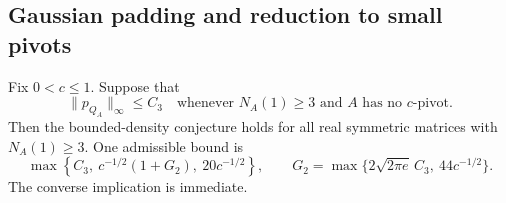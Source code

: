 \subsection{Gaussian padding and reduction to small pivots}

\begin{theorem}
\label{thm:no-pivot-equivalence}
Fix \(0<c\leq1\).  Suppose that
\begin{equation}
 \|p_{Q_A}\|_\infty\leq C_3
 \quad\text{whenever }N_A(1)\geq3
 \text{ and \(A\) has no \(c\)-pivot}.
 \label{eq:no-pivot-hypothesis}
\end{equation}
Then the bounded-density conjecture holds for all real symmetric
matrices with \(N_A(1)\geq3\).  One admissible bound is
\[
 \max\left\{C_3,\ c^{-1/2}(1+G_2),\ 20c^{-1/2}\right\},
 \qquad
 G_2=\max\{2\sqrt{2\pi e}\,C_3,\ 44c^{-1/2}\}.
\]
The converse implication is immediate.
\end{theorem}
